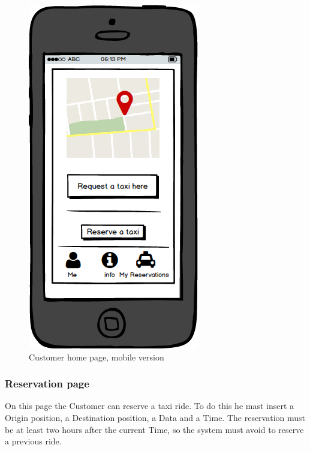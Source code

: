 \documentclass{report}
\begin{document}
				\begin{figure}[H]
					\centering
					\includegraphics[scale=0.4]{IMG/UserInterfaces/mainCustomer_m.png}
					\caption{Customer home page, mobile version}\label{visina8}
				\end{figure}
			
			\subsubsection{Reservation page}
			On this page the Customer can reserve a taxi ride. To do this he mast insert a Origin position, a Destination position, a Data and a Time. The reservation must be at least two hours after 			the current Time, so the system must avoid to reserve a previous ride.
			
\end{document}

